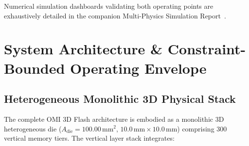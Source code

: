\documentclass[journal]{IEEEtran}
\begin{document}
Numerical simulation dashboards validating both operating points are exhaustively detailed in the companion Multi-Physics Simulation Report~\cite{omi_sim_report}.

\section{System Architecture \& Constraint-Bounded Operating Envelope}
\label{sec:system_arch}

\subsection{Heterogeneous Monolithic 3D Physical Stack}
The complete OMI 3D Flash architecture is embodied as a monolithic 3D heterogeneous die ($A_{\text{die}} = 100.00\,\text{mm}^2$, $10.0\,\text{mm} \times 10.0\,\text{mm}$) comprising 300 vertical memory tiers. The vertical layer stack integrates:
\end{document}
